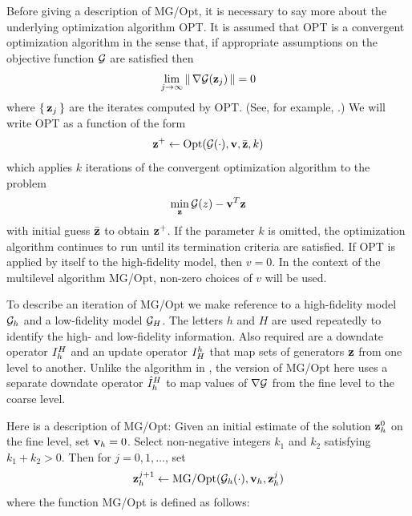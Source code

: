 \documentclass{siamltex}
\begin{document}
Before giving a description of MG/Opt, it is necessary to say more about the underlying optimization algorithm OPT.  It is assumed that OPT is a convergent optimization algorithm in the sense that, if appropriate assumptions on the objective function $\cg$ are satisfied then
$$
\lim_{j\rightarrow \infty} \norm{\nabla \cg(\bz_j)} = 0
$$
where $\left\{\,{\bf z}_j\,\right\}$ are the iterates computed by OPT.  (See, for example, \cite{GrNaSo08a}.)  We will write OPT as a function of the form
$$
\bz^+ \leftarrow \mbox{Opt}(\cg(\cdot),\bv,\bar \bz,k)
$$
which applies $k$ iterations of the convergent optimization algorithm to the problem
$$
\min_{\bz} \cg(z) - \bv\tr \bz
$$
with initial guess $\bar {{\bf z}}$ to obtain ${\bf z}^+$.  If the parameter $k$ is omitted, the optimization algorithm continues to run until its termination criteria are satisfied.  If OPT is applied by itself to the high-fidelity model, then $v = 0$.  In the context of the multilevel algorithm MG/Opt, non-zero choices of $v$ will be used.

To describe an iteration of MG/Opt we make reference to a high-fidelity model $\cg_h$ and a low-fidelity model $\cg_H$.  The letters $h$ and $H$ are used repeatedly to identify the high- and low-fidelity information.  Also required are a downdate operator $I_h^H$ and an update operator $I_H^h$ that map sets of generators ${\bf z}$ from one level to another.  Unlike the algorithm in \cite{Nash10a}, the version of MG/Opt here uses a separate downdate operator ${\hat I}_h^H$ to map values of $\nabla \cg$ from the fine level to the coarse level.

Here is a description of MG/Opt:
Given an initial estimate of the solution ${\bf z}_h^0$ on the fine level, set ${\bf v}_h = 0$.  Select non-negative integers $k_1$ and $k_2$ satisfying $k_1+k_2>0$.  Then for $j = 0, 1, \ldots$, set
$$
\bz_h^{j+1} \leftarrow
\mbox{MG/Opt}(\cg_h(\cdot),\bv_h,\bz_h^j)
$$
where the function MG/Opt is defined as follows:
\end{document}
